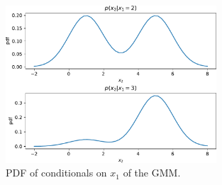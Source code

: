 \begin{figure}[htbp]
  \centering
  \includegraphics[width=0.7\textwidth]{./figures/cond_pdf.pdf}
  \caption{
    PDF of conditionals on $x_1$ of the GMM.
  }
  \label{fig:week3:pyro:cond-pdf}
\end{figure}
